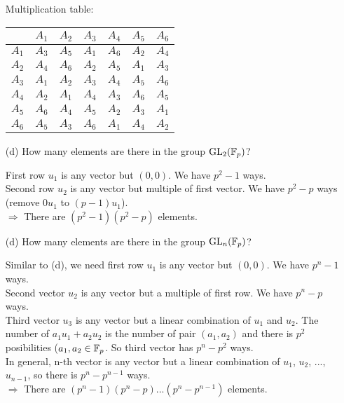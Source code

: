 \begin{exer}[2.15]
\begin{enumerate}
    Multiplication table:
    
    \begin{center}
        \begin{tabular}{|c||c|c|c|c|c|c|}
            \hline
            & $A_1$ & $A_2$ & $A_3$ & $A_4$ & $A_5$ & $A_6$ \\ \hline\hline
            $A_1$ & $A_3$ & $A_5$ & $A_1$ & $A_6$ & $A_2$ & $A_4$ \\ \hline
            $A_2$ & $A_4$ & $A_6$ & $A_2$ & $A_5$ & $A_1$ & $A_3$ \\ \hline
            $A_3$ & $A_1$ & $A_2$ & $A_3$ & $A_4$ & $A_5$ & $A_6$ \\ \hline
            $A_4$ & $A_2$ & $A_1$ & $A_4$ & $A_3$ & $A_6$ & $A_5$ \\ \hline
            $A_5$ & $A_6$ & $A_4$ & $A_5$ & $A_2$ & $A_3$ & $A_1$ \\ \hline
            $A_6$ & $A_5$ & $A_3$ & $A_6$ & $A_1$ & $A_4$ & $A_2$ \\
            \hline
        \end{tabular}
    \end{center}
    \item [(d)] How many elements are there in the group $\text{GL}_2(\mathbb{F}_p)$?
    
    First row $u_1$ is any vector but $(0, 0)$. We have $p^2-1$ ways. \\ Second row $u_2$ is any vector but multiple of first vector. We have $p^2-p$ ways (remove $0u_1$ to $(p-1)u_1$). \\ $\Rightarrow$ There are $(p^2-1)(p^2-p)$ elements.
    \item [(d)] How many elements are there in the group $\text{GL}_n(\mathbb{F}_p)$?
    
    Similar to (d), we need first row $u_1$ is any vector but $(0,0)$. We have $p^n-1$ ways. \\ Second vector $u_2$ is any vector but a multiple of first row. We have $p^n-p$ ways. \\ Third vector $u_3$ is any vector but a linear combination of $u_1$ and $u_2$. The number of $a_1u_1 + a_2u_2$ is the number of pair $(a_1, a_2)$ and there is $p^2$ posibilities ($a_1, a_2 \in \mathbb{F}_p$. So third vector has $p^n-p^2$ ways. \\ In general, n-th vector is any vector but a linear combination of $u_1$, $u_2$, ..., $u_{n-1}$, so there is $p^n-p^{n-1}$ ways. \\ $\Rightarrow$ There are $(p^n-1)(p^n-p)...(p^n-p^{n-1})$ elements.
\end{enumerate}
\end{exer}

